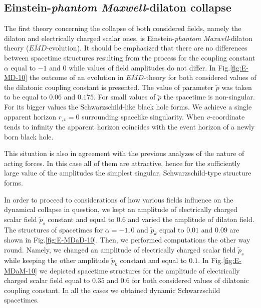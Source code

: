 \documentclass[aps,showpacs,nofootinbib,floatfix]{revtex4}
\newcommand{\tpe}{{\tilde p}}
\begin{document}
\subsection{Einstein-{\it phantom Maxwell}-dilaton collapse}
The first theory concerning the collapse of both considered fields, namely the dilaton and electrically charged 
scalar ones, is Einstein-{\it phantom Maxwell}-dilaton theory ($E\overline{M}D$-evolution). It should be emphasized that there are no differences between spacetime structures resulting from the process for the coupling constant $\alpha$ equal to $-1$ and $0$ while values of field amplitudes do not differ. In Fig.\ref{fig:E-MD-10} the outcome of an evolution in $E\overline{M}D$-theory for both considered values of the dilatonic coupling constant is presented. The value of parameter $\tpe$ was taken to be equal to $0.06$ and $0.175$.
For small values of $\tpe$ the spacetime is non-singular. For its bigger values the Schwarzschild-like black hole forms. We achieve a single apparent horizon $r_{,v}=0$ surrounding spacelike singularity. When $v$-coordinate tends to infinity the apparent horizon coincides with the event horizon of a newly born black hole.
\par
This situation is also in agreement with the previous analyzes of the nature of acting forces. In this case 
all of them are attractive, hence for the sufficiently large value of the amplitudes the simplest singular, Schwarzschild-type structure forms.
\par
In order to proceed to considerations of how various fields influence on the dynamical collapse
in question, we kept an amplitude of electrically charged scalar field $\tpe_s$ constant and equal to $0.6$ 
and varied the amplitude of dilaton field. The structures of spacetimes for $\alpha=-1,0$ and $\tpe_k$ equal to $0.01$ and $0.09$ are shown in Fig.\ref{fig:E-MDaD-10}.
Then, we performed computations the other way round. Namely, we changed an amplitude of electrically charged scalar field $\tpe_s$ while keeping the other amplitude $\tpe_k$ constant and equal to $0.1$. In Fig.\ref{fig:E-MDaM-10} we depicted spacetime structures for the amplitude of electrically charged scalar field equal to $0.35$ and $0.6$ for both considered values of dilatonic coupling constant. In all the cases we obtained dynamic Schwarzschild spacetimes.
\end{document}
